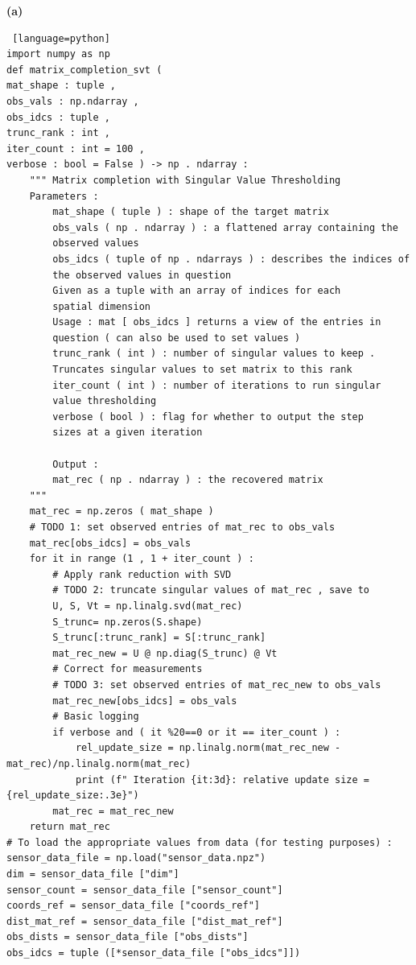\documentclass[a4paper, 12pt]{article}
\begin{document}
\begin{problem} [Problem 3]
\end{problem}
\begin{solution}
\textbf{(a)}
\begin{lstlisting} [language=python]
import numpy as np
def matrix_completion_svt (
mat_shape : tuple ,
obs_vals : np.ndarray ,
obs_idcs : tuple ,
trunc_rank : int ,
iter_count : int = 100 ,
verbose : bool = False ) -> np . ndarray :
    """ Matrix completion with Singular Value Thresholding
    Parameters :
        mat_shape ( tuple ) : shape of the target matrix
        obs_vals ( np . ndarray ) : a flattened array containing the
        observed values
        obs_idcs ( tuple of np . ndarrays ) : describes the indices of
        the observed values in question
        Given as a tuple with an array of indices for each
        spatial dimension
        Usage : mat [ obs_idcs ] returns a view of the entries in
        question ( can also be used to set values )
        trunc_rank ( int ) : number of singular values to keep .
        Truncates singular values to set matrix to this rank
        iter_count ( int ) : number of iterations to run singular
        value thresholding
        verbose ( bool ) : flag for whether to output the step
        sizes at a given iteration
        
        Output :
        mat_rec ( np . ndarray ) : the recovered matrix
    """
    mat_rec = np.zeros ( mat_shape )
    # TODO 1: set observed entries of mat_rec to obs_vals
    mat_rec[obs_idcs] = obs_vals
    for it in range (1 , 1 + iter_count ) :
        # Apply rank reduction with SVD
        # TODO 2: truncate singular values of mat_rec , save to
        U, S, Vt = np.linalg.svd(mat_rec)
        S_trunc= np.zeros(S.shape)
        S_trunc[:trunc_rank] = S[:trunc_rank]
        mat_rec_new = U @ np.diag(S_trunc) @ Vt
        # Correct for measurements
        # TODO 3: set observed entries of mat_rec_new to obs_vals
        mat_rec_new[obs_idcs] = obs_vals
        # Basic logging
        if verbose and ( it %20==0 or it == iter_count ) :
            rel_update_size = np.linalg.norm(mat_rec_new - mat_rec)/np.linalg.norm(mat_rec)
            print (f" Iteration {it:3d}: relative update size ={rel_update_size:.3e}")
        mat_rec = mat_rec_new
    return mat_rec
# To load the appropriate values from data (for testing purposes) :
sensor_data_file = np.load("sensor_data.npz")
dim = sensor_data_file ["dim"]
sensor_count = sensor_data_file ["sensor_count"]
coords_ref = sensor_data_file ["coords_ref"]
dist_mat_ref = sensor_data_file ["dist_mat_ref"]
obs_dists = sensor_data_file ["obs_dists"]
obs_idcs = tuple ([*sensor_data_file ["obs_idcs"]])


\end{lstlisting}
\end{solution}
\end{document}
